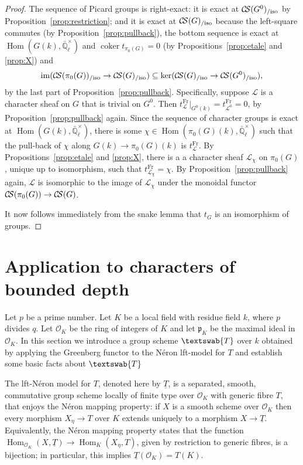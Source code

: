 \documentclass[11pt]{amsart}
\theoremstyle{plain}
\theoremstyle{definition}
\theoremstyle{remark}
\newcommand{\EE}{\mathbb{\bar Q}_\ell}
\newcommand{\OK}{\mathcal{O}_K}
\newcommand{\pK}{\mathfrak{p}_K}
\newcommand{\Fq}{k}
\newcommand{\Frob}{{\operatorname{Fr}}}
\DeclareMathOperator{\Hom}{Hom}
\DeclareMathOperator{\coker}{coker}
\newcommand{\GN}[1]{\textswab{#1}}
\newcommand{\TT}{\underline{T}}
\newcommand{\cs}[1]{{\mathcal{#1}}}
\newcommand{\CS}{{\mathcal{C\hskip-1.8pt S}}}
\newcommand{\image}{{\operatorname{im}}}
\begin{document}
\begin{proof}
The sequence of Picard groups is right-exact:  it is exact at $\CS(G^0)_{/\text{iso}}$ by Proposition~\ref{prop:restriction}; and it is exact at $\CS(G)_{/\text{iso}}$ because the left-square commutes (by Proposition~\ref{prop:pullback}), the bottom sequence is exact at $\Hom(G(\Fq),\EE^\times)$ and $\coker t_{\pi_0(G)} =0$ (by Propositions~\ref{prop:etale} and \ref{prop:X}) and
\[
\image(\CS(\pi_0(G))_{/\text{iso}} \to \CS(G)_{/\text{iso}}) \subseteq \ker(\CS(G)_{/\text{iso}} \to \CS(G^0)_{/\text{iso}}),
\]
by the last part of Proposition~\ref{prop:pullback}. Specifically, suppose $\cs{L}$ is a character sheaf on $G$ that is trivial on $G^0$. Then $t^\Frob_\cs{L}\vert_{G^0(\Fq)} = t^\Frob_{\cs{L}^0} =0$, by Proposition~\ref{prop:pullback} again. Since the sequence of character groups is exact at $\Hom(G(\Fq),\EE^\times)$, there is some $\chi \in \Hom(\pi_0(G)(\Fq),\EE^\times)$ such that the pull-back of $\chi$ along $G(\Fq)\to \pi_0(G)(\Fq)$ is $t^\Frob_\cs{L}$. By Propositions~\ref{prop:etale} and \ref{prop:X}, there is a a character sheaf $\cs{L}_\chi$ on $\pi_0(G)$, unique up to isomorphism, such that $t^\Frob_{\cs{L}_\chi} = \chi$. By Proposition~\ref{prop:pullback} again, $\cs{L}$ is isomorphic to the image of $\cs{L}_\chi$ under the monoidal functor $\CS(\pi_0(G)) \to \CS(G)$.

It now follows immediately from the snake lemma that $t_{G}$ is an isomorphism of groups.
\end{proof}

\section{Application to characters of bounded depth}

%
Let $p$ be a prime number. Let $K$ be a local field with residue field $\Fq$, where $p$ divides $q$. Let $\OK$ be the ring of integers of $K$ and let $\pK$ be the maximal ideal in $\OK$.
%
In this section we introduce a group scheme $\GN{T}$ over $\Fq$ obtained by applying the Greenberg functor to the N\'eron lft-model for $T$ and establish some basic facts about $\GN{T}$


The lft-N\'eron model for $T$, denoted here by $\TT$, is a separated, smooth, commutative group scheme locally of finite type over $\OK$ with generic fibre $T$, that enjoys the N\'eron mapping property: if $X$ is a smooth scheme over $\OK$ then every morphism $X_\eta \to T$ over $K$ extends uniquely to a morphism $X \to \TT$. Equivalently, the N\'eron mapping property states that the function $\Hom_{\OK} (X,\TT) \to \Hom_K(X_\eta,T)$, given by restriction to generic fibres, is a bijection; in particular, this implies $\TT(\OK) = T(K)$.
\end{document}
